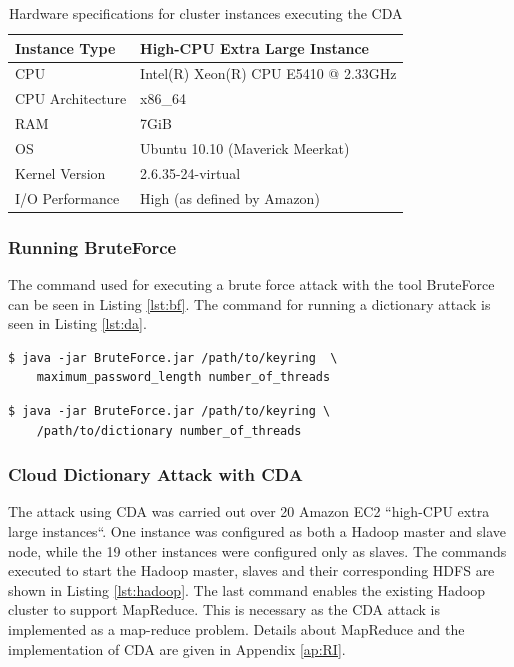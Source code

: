 \documentclass[pdftex,english,10pt,b5paper,twoside]{book}
\begin{document}
\begin{table}[!h]
    \centering
    \caption{Hardware specifications for cluster instances executing the
    \ac{CDA}}
    \label{tab:hwcda}
    \begin{tabular}{| l | l |}
	\hline
	Instance Type       &High-CPU Extra Large Instance\\
	\hline
	CPU		            &Intel(R) Xeon(R) CPU E5410 @ 2.33GHz\\
	\hline
	CPU Architecture    &x86\_64\\
	\hline
	RAM		            &7GiB\\
	\hline
	OS		            &Ubuntu 10.10 (Maverick Meerkat)\\
	\hline
	Kernel Version	    &2.6.35-24-virtual\\
	\hline
	I/O Performance	    &High (as defined by Amazon)\\
	\hline
    \end{tabular}
\end{table}

\subsubsection{Running BruteForce}
The command used for executing a brute force attack with the tool BruteForce
can be seen in Listing \ref{lst:bf}. The command for running a dictionary
attack is seen in Listing \ref{lst:da}.

\lstset{label=lst:bf, caption=Running local brute force attack}
\begin{lstlisting}
$ java -jar BruteForce.jar /path/to/keyring  \
    maximum_password_length number_of_threads
\end{lstlisting}

\lstset{label=lst:da, caption=Running local dictionary attack}
\begin{lstlisting}
$ java -jar BruteForce.jar /path/to/keyring \
    /path/to/dictionary number_of_threads
\end{lstlisting}

\subsubsection{Cloud Dictionary Attack with \ac{CDA}} The attack using \ac{CDA}
was carried out over 20 Amazon EC2 ``high-CPU extra large instances``. One
instance was configured as both a Hadoop master and slave node, while the 19
other instances were configured only as slaves. The commands executed to start
the Hadoop master, slaves and their corresponding \ac{HDFS} are shown in
Listing \ref{lst:hadoop}. The last command enables the existing Hadoop cluster
to support MapReduce. This is necessary as the \ac{CDA} attack is implemented
as a map-reduce problem. Details about MapReduce and the implementation of
\ac{CDA} are given in Appendix \ref{ap:RI}.\\
\end{document}
